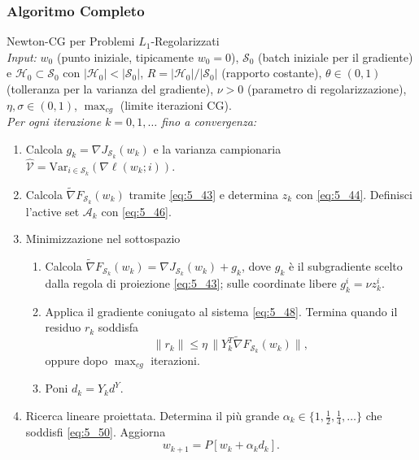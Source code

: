 \documentclass[a4paper,12pt]{article}
\numberwithin{equation}{section}
\numberwithin{figure}{section}
\numberwithin{table}{section}
\newcommand{\Var}{\mathrm{Var}}
\begin{document}
\newpage

\subsubsection{Algoritmo Completo}

\begin{actionbox}
  Newton-CG per Problemi $L_1$-Regolarizzati\\[0.3cm]
  \textit{Input:} $w_0$ (punto iniziale, tipicamente $w_0=0$),
  $\mathcal{S}_0$ (batch iniziale per il gradiente) e
  $\mathcal{H}_0 \subset \mathcal{S}_0$ con $|\mathcal{H}_0| < |\mathcal{S}_0|$,
  $R = |\mathcal{H}_0|/|\mathcal{S}_0|$ (rapporto costante),
  $\theta \in (0,1)$ (tolleranza per la varianza del gradiente),
  $\nu > 0$ (parametro di regolarizzazione),
  $\eta, \sigma \in (0,1)$,
  $\operatorname{max}_{cg}$ (limite iterazioni CG).\\[0.1cm]
  
  \textit{Per ogni iterazione $k = 0, 1, \dots$ fino a convergenza:}
  \begin{enumerate}
    \item
    Calcola $g_k = \nabla J_{\mathcal{S}_k}(w_k)$ e la varianza campionaria
    $\widehat{\mathcal{V}} = \Var_{i \in \mathcal{S}_k}(\nabla \ell(w_k;i))$.

    \item
    Calcola $\widetilde{\nabla}F_{\mathcal{S}_k}(w_k)$ tramite \eqref{eq:5_43} e
    determina $z_k$ con \eqref{eq:5_44}. Definisci l'active set $\mathcal{A}_k$ con \eqref{eq:5_46}.
    
    \item Minimizzazione nel sottospazio
    \begin{enumerate}
      \item Calcola $\widetilde{\nabla}F_{\mathcal{S}_k}(w_k) = \nabla J_{\mathcal{S}_k}(w_k) + g_k$, dove $g_k$ è il subgradiente scelto dalla regola di proiezione \eqref{eq:5_43}; sulle coordinate libere $g_k^i = \nu z_k^i$.
      \item Applica il gradiente coniugato al sistema \eqref{eq:5_48}. Termina quando
      il residuo $r_k$ soddisfa
      \[
      \|r_k\| \le \eta \, \|Y_k^T \widetilde{\nabla}F_{\mathcal{S}_k}(w_k)\|, \tag{5.51}\label{eq:cg_l1}
      \]
      oppure dopo $\operatorname{max}_{cg}$ iterazioni.
      \item Poni $d_k = Y_k d^Y$.
    \end{enumerate}
    
    \item Ricerca lineare proiettata.
    Determina il più grande $\alpha_k \in \{1, \frac{1}{2}, \frac{1}{4}, \dots\}$
    che soddisfi \eqref{eq:5_50}. Aggiorna
    \[
    w_{k+1} = P[w_k + \alpha_k d_k].
    \]
    

\end{enumerate}
\end{actionbox}
\end{document}
